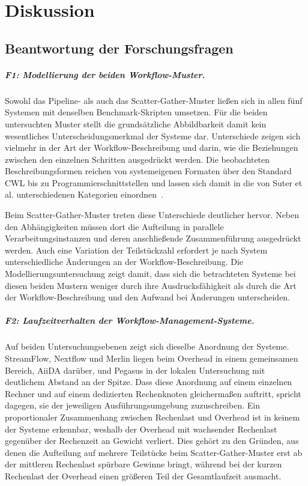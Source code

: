 
\chapter{Diskussion}
\label{sec:diskussion}

\section{Beantwortung der Forschungsfragen}
\label{sec:diskussion:fragen}

\paragraph{F1: Modellierung der beiden Workflow-Muster.}
Sowohl das Pipeline- als auch das Scatter-Gather-Muster ließen sich
in allen fünf Systemen mit denselben Benchmark-Skripten umsetzen.
Für die beiden untersuchten Muster stellt die grundsätzliche
Abbildbarkeit damit kein wesentliches Unterscheidungsmerkmal der
Systeme dar. Unterschiede zeigen sich vielmehr in der Art der
Workflow-Beschreibung und darin, wie die Beziehungen zwischen den
einzelnen Schritten ausgedrückt werden. Die
beobachteten Beschreibungsformen reichen von systemeigenen Formaten
über den Standard CWL bis zu Programmierschnittstellen und lassen
sich damit in die von Suter et al. unterschiedenen Kategorien
einordnen~\cite{suter2026terminology}.

Beim Scatter-Gather-Muster treten diese Unterschiede deutlicher
hervor. Neben den Abhängigkeiten müssen dort die Aufteilung in
parallele Verarbeitungsinstanzen und deren anschließende
Zusammenführung ausgedrückt werden. Auch eine Variation der
Teilstückzahl erfordert je nach System unterschiedliche Änderungen
an der Workflow-Beschreibung. Die Modellierungsuntersuchung zeigt
damit, dass sich die betrachteten Systeme bei diesen beiden Mustern
weniger durch ihre Ausdrucksfähigkeit als durch die Art der
Workflow-Beschreibung und den Aufwand bei Änderungen unterscheiden.

\paragraph{F2: Laufzeitverhalten der Workflow-Management-Systeme.}
Auf beiden Untersuchungsebenen zeigt sich dieselbe Anordnung der
Systeme. StreamFlow, Nextflow und Merlin liegen beim Overhead in
einem gemeinsamen Bereich, AiiDA darüber, und Pegasus in der
lokalen Untersuchung mit deutlichem Abstand an der Spitze. Dass
diese Anordnung auf einem einzelnen Rechner und auf einem
dedizierten Rechenknoten gleichermaßen auftritt, spricht dagegen,
sie der jeweiligen Ausführungsumgebung zuzuschreiben. Ein
proportionaler Zusammenhang zwischen Rechenlast und Overhead ist in
keinem der Systeme erkennbar, weshalb der Overhead mit wachsender
Rechenlast gegenüber der Rechenzeit an Gewicht verliert. Dies
gehört zu den Gründen, aus denen die Aufteilung auf mehrere
Teilstücke beim Scatter-Gather-Muster erst ab der mittleren
Rechenlast spürbare Gewinne bringt, während bei der kurzen
Rechenlast der Overhead einen größeren Teil der Gesamtlaufzeit ausmacht.

